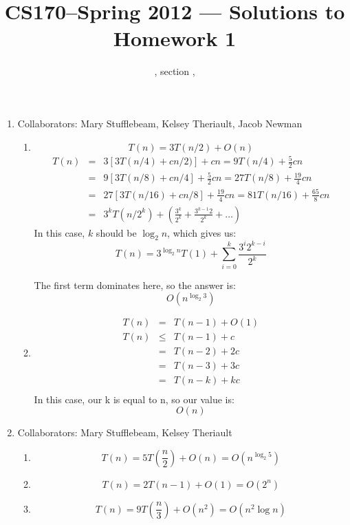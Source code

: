 \documentclass[11pt]{article}
\title{CS170--Spring 2012 --- Solutions to Homework 1}
\author{\Name, section \Sec, \texttt{\Login}}
\begin{document}
\maketitle

\begin{enumerate}
\item 

Collaborators: Mary Stufflebeam, Kelsey Theriault, Jacob Newman
\begin{enumerate}

\item
\begin{equation*}
T(n) = 3T(n/2) + O(n)
\end{equation*}
\begin{eqnarray*}
T(n) &=& 3[3T(n/4) + cn/2)] + cn = 9T(n/4) + \frac{5}{2}cn \\
&=& 9[3T(n/8) + cn/4] + \frac52cn = 27T(n/8) + \frac{19}4cn\\
&=& 27[3T(n/16) + cn/8] + \frac{19}4cn = 81T(n/16) + \frac{65}8cn\\
&=& 3^kT(n/2^k) + (\frac{3^k}{2^k} + \frac{3^{k-1}2}{2^k} + \dots)
\end{eqnarray*}
In this case, $k$ should be $\log_2 n$, which gives us:
\begin{equation*}
T(n) = 3^{\log_2 n}T(1) + \sum_{i=0}^{k}\frac{3^{i}2^{k-i}}{2^k}
\end{equation*}

The first term dominates here, so the answer is:
\begin{equation*}
O(n^{\log_2 3})
\end{equation*}

\item 
\begin{eqnarray*}
T(n) &=& T(n − 1) + O(1)\\
T(n) &\le& T(n-1) + c\\
&=& T(n-2) + 2c \\
&=& T(n-3) + 3c \\
&=& T(n-k) + kc \\
\end{eqnarray*}
In this case, our k is equal to n, so our value is:
\begin{equation*}
O(n)
\end{equation*}
\end{enumerate}

\newpage

\item 
Collaborators: Mary Stufflebeam, Kelsey Theriault
\begin{enumerate}
\item 
\begin{equation*}
T(n) = 5T\left(\frac{n}{2}\right) + O(n) = O(n^{\log_2 5})
\end{equation*}
\item
\begin{equation*}
T(n) = 2T\left(n - 1\right) + O(1) = O(2^n)
\end{equation*}
\item
\begin{equation*}
T(n) = 9T\left(\frac{n}{3}\right) + O(n^2) = O(n^2\log n)
\end{equation*}
\end{enumerate}


\end{enumerate}
\end{document}
